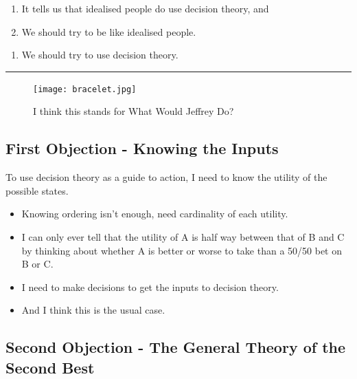 \documentclass[
  11pt,
  letterpaper,
  DIV=11,
  numbers=noendperiod,
  oneside]{scrartcl}
\providecommand{\tightlist}{%
  \setlength{\itemsep}{0pt}\setlength{\parskip}{0pt}}\usepackage{longtable,booktabs,array}
\begin{document}
\begin{enumerate}
\def\labelenumi{\arabic{enumi}.}
\tightlist
\item
  It tells us that idealised people do use decision theory, and
\item
  We should try to be like idealised people.
\end{enumerate}

\begin{enumerate}
\def\labelenumi{\Alph{enumi}.}
\setcounter{enumi}{2}
\tightlist
\item
  We should try to use decision theory.
\end{enumerate}

\begin{center}\rule{0.5\linewidth}{0.5pt}\end{center}

\begin{figure}[H]

{\centering \texttt{[image: bracelet.jpg]}

}

\caption{I think this stands for What Would Jeffrey Do?}

\end{figure}%

\subsection{First Objection - Knowing the
Inputs}\label{first-objection---knowing-the-inputs}

To use decision theory as a guide to action, I need to know the utility
of the possible states.

\begin{itemize}
\tightlist
\item
  Knowing ordering isn't enough, need cardinality of each utility.
\item
  I can only ever tell that the utility of A is half way between that of
  B and C by thinking about whether A is better or worse to take than a
  50/50 bet on B or C.
\item
  I need to make decisions to get the inputs to decision theory.
\item
  And I think this is the usual case.
\end{itemize}

\subsection{Second Objection - The General Theory of the Second
Best}\label{second-objection---the-general-theory-of-the-second-best}
\end{document}
